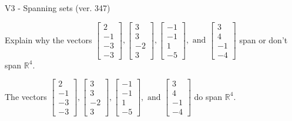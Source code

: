 \begin{exercise}
  \begin{exerciseTitle}V3 - Spanning sets (ver. 347)\end{exerciseTitle}
  \begin{exerciseStatement}
    Explain why the vectors \(\left[\begin{array}{r}
2 \\
-1 \\
-3 \\
-3
\end{array}\right] , \left[\begin{array}{r}
3 \\
3 \\
-2 \\
3
\end{array}\right] , \left[\begin{array}{r}
-1 \\
-1 \\
1 \\
-5
\end{array}\right] , \text{ and } \left[\begin{array}{r}
3 \\
4 \\
-1 \\
-4
\end{array}\right]\) span or don't span \(\mathbb{R}^4\). 
	


  \end{exerciseStatement}
  \begin{exerciseAnswer}
   The vectors \(\left[\begin{array}{r}
2 \\
-1 \\
-3 \\
-3
\end{array}\right] , \left[\begin{array}{r}
3 \\
3 \\
-2 \\
3
\end{array}\right] , \left[\begin{array}{r}
-1 \\
-1 \\
1 \\
-5
\end{array}\right] , \text{ and } \left[\begin{array}{r}
3 \\
4 \\
-1 \\
-4
\end{array}\right]\) 
  	 do  
	span \(\mathbb{R}^4\).
  


  \end{exerciseAnswer}
\end{exercise}